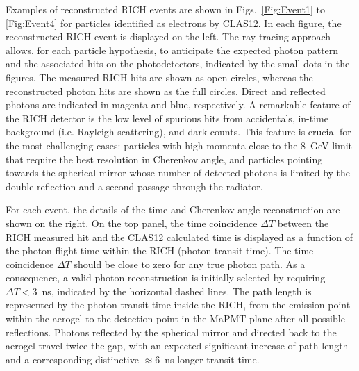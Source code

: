 \documentclass[5p,times,twocolumn]{elsarticle}
\begin{document}
Examples of reconstructed RICH events are shown in Figs.~\ref{Fig:Event1} to \ref{Fig:Event4} for particles
identified as electrons by CLAS12. In each figure, the reconstructed RICH event is displayed on the left. The
ray-tracing approach allows, for each particle hypothesis, to anticipate the expected photon pattern and the associated
hits on the photodetectors, indicated by the small dots in the figures.
The measured RICH hits are shown as open circles, whereas the reconstructed photon hits are shown as the full
circles. Direct and reflected photons are indicated in magenta and blue, respectively. A remarkable feature of the
RICH detector is the low level of spurious hits from accidentals, in-time background (i.e. Rayleigh scattering), and
dark counts. This feature is crucial for the most challenging cases: particles with high momenta close to the 8~GeV
limit that require the best resolution in Cherenkov angle, and particles pointing towards the spherical mirror whose
number of detected photons is limited by the double reflection and a second passage through the radiator. 

For each event, the details of the time and Cherenkov angle reconstruction are shown on the right. On the top panel,
the time coincidence $\Delta T$ between the RICH measured hit and the CLAS12 calculated time is displayed as a
function of the photon flight time within the RICH (photon transit time). The time coincidence $\Delta T$ should be
close to zero for any true photon path. As a consequence, a valid photon reconstruction is initially selected by
requiring $\Delta T<3$~ns, indicated by the horizontal dashed lines. The path length is represented by the photon
transit time inside the RICH, from the emission point within the aerogel to the detection point in the MaPMT plane
after all possible reflections. Photons reflected by the spherical mirror and directed back to the aerogel travel
twice the gap, with an expected significant increase of path length and a corresponding distinctive $\approx$6~ns
longer transit time. %
\end{document}
